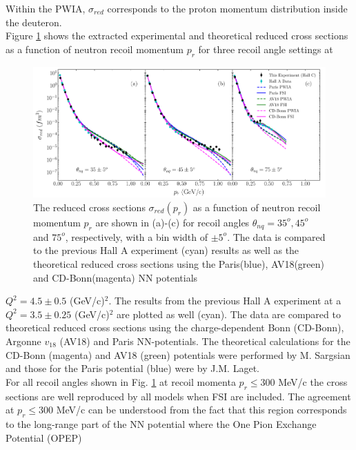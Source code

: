Within the PWIA, $\sigma_{red}$ corresponds to the proton momentum distribution inside the deuteron. \\
\indent Figure \ref{fig:fig1} shows the extracted experimental and theoretical reduced cross sections as a function of neutron recoil momentum
$p_{r}$ for three recoil angle settings at
\onecolumngrid
\begin{center}
\begin{figure}[hb!]
\includegraphics[scale=0.46]{prl_plots/PRL_plot1.pdf}
\caption{The reduced cross sections $\sigma_{red}(p_{r})$ as a function of neutron recoil momentum $p_{r}$ are shown in (a)-(c) for recoil angles $\theta_{nq}=35^{o}, 45^{o}$ and $75^{o}$, respectively,
with a bin width of $\pm 5^{o}$. The data is compared to the previous Hall A experiment (cyan) results\cite{PhysRevLett.107.262501} as well as the theoretical reduced cross sections using the Paris(blue),
AV18(green) and CD-Bonn(magenta) NN potentials}
\label{fig:fig1}
\end{figure}
\end{center}
\twocolumngrid
\noindent $Q^{2}=4.5\pm0.5$ (GeV/c)$^{2}$. The results from the previous Hall A experiment\cite{PhysRevLett.107.262501} at a $Q^{2}=3.5\pm0.25$ (GeV/c)$^{2}$ are plotted as well (cyan). The data are compared to theoretical reduced
cross sections using the charge-dependent Bonn (CD-Bonn)\cite{PhysRevC.63.024001}, Argonne $v_{18}$ (AV18)\cite{PhysRevC.51.38} and Paris\cite{PhysRevC.21.861} NN-potentials. The theoretical calculations
for the CD-Bonn (magenta) and AV18 (green) potentials were performed by M. Sargsian\cite{PhysRevC.82.014612} and those for the Paris potential  (blue) were  by J.M. Laget\cite{LAGET2005}.\\
\indent For all recoil angles shown in Fig. \hyperref[fig:fig1]{1} at recoil momenta $p_{r}\leq$300 MeV/c the cross sections are well reproduced  by  all models when FSI are included.
The agreement at $p_{r}\leq300$ MeV/c can be understood from the fact that this region corresponds to the long-range part of the NN potential where the One Pion Exchange Potential (OPEP)
